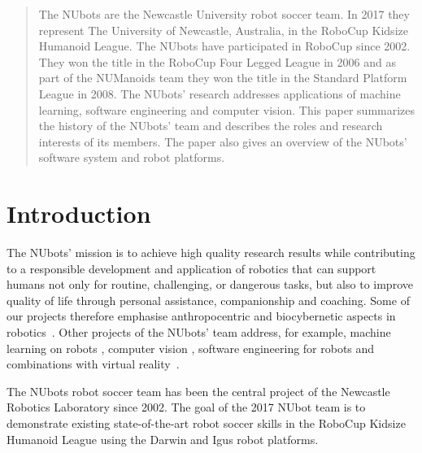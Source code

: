 \documentclass{llncs}
\begin{document}
\begin{abstract}
The NUbots are the Newcastle University robot soccer team. In 2017 they represent The University of Newcastle, Australia, in the RoboCup Kidsize Humanoid League. The NUbots have participated in RoboCup since 2002. They won the title in the RoboCup Four Legged League in 2006 and as part of the NUManoids team they won the title in the Standard Platform League in 2008. The NUbots' research addresses applications of machine learning, software engineering and computer vision. This paper summarizes the history of the NUbots' team and describes the roles and research interests of its members. The paper also gives an overview of the NUbots' software system and robot platforms. 

\end{abstract}

%
\section{Introduction}
The NUbots' mission is to achieve high quality research results while contributing to a responsible development and application of robotics that can support humans not only for routine, challenging, or dangerous tasks, but also to improve quality of life through personal assistance, companionship and coaching. Some of our projects therefore emphasise anthropocentric and biocybernetic aspects in robotics~\cite{ChalupOstwald2009,WalkerChalup2015,HongEtAl2014,WongEtAl2012,WongEtAl2013}.
Other projects of the NUbots' team address, for example, machine learning on robots \cite{ChalupEtAlSMC2007,FountainEtAl2014,AzizEtAl2015}, computer vision \cite{MetcalfeEtAl2016}, software engineering for robots \cite{HoulistonEtAl2016} and combinations with virtual reality~\cite{FountainChalup2015}.


The NUbots robot soccer team has been the central project of the Newcastle Robotics Laboratory since 2002. The goal of the 2017 NUbot team is to demonstrate existing state-of-the-art robot soccer skills in the RoboCup Kidsize Humanoid League using the Darwin and Igus robot platforms.
\end{document}
